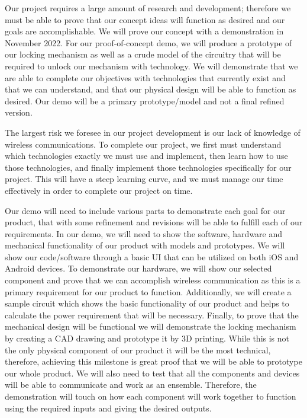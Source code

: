 \documentclass{article}
\begin{document}
Our project requires a large amount of research and development; therefore we must be able to prove that our concept ideas will function as desired and our goals are accomplishable.  We will prove our concept with a demonstration in November 2022.  For our proof-of-concept demo, we will produce a prototype of our locking mechanism as well as a crude model of the circuitry that will be required to unlock our mechanism with technology.  We will demonstrate that we are able to complete our objectives with technologies that currently exist and that we can understand, and that our physical design will be able to function as desired.  Our demo will be a primary prototype/model and not a final refined version.  

The largest risk we foresee in our project development is our lack of knowledge of wireless communications. To complete our project, we first must understand which technologies exactly we must use and implement, then learn how to use those technologies, and finally implement those technologies specifically for our project.  This will have a steep learning curve, and we must manage our time effectively in order to complete our project on time. 

Our demo will need to include various parts to demonstrate each goal for our product, that with some refinement and revisions will be able to fulfill each of our requirements. In our demo, we will need to show the software, hardware and mechanical functionality of our product with models and prototypes.  We will show our code/software through a basic UI that can be utilized on both iOS and Android devices.  To demonstrate our hardware, we will show our selected component and prove that we can accomplish wireless communication as this is a primary requirement for our product to function.  Additionally, we will create a sample circuit which shows the basic functionality of our product and helps to calculate the power requirement that will be necessary.  Finally, to prove that the mechanical design will be functional we will demonstrate the locking mechanism by creating a CAD drawing and prototype it by 3D printing.  While this is not the only physical component of our product it will be the most technical, therefore, achieving this milestone is great proof that we will be able to prototype our whole product.  We will also need to test that all the components and devices will be able to communicate and work as an ensemble.  Therefore, the demonstration will touch on how each component will work together to function using the required inputs and giving the desired outputs.
\end{document}
